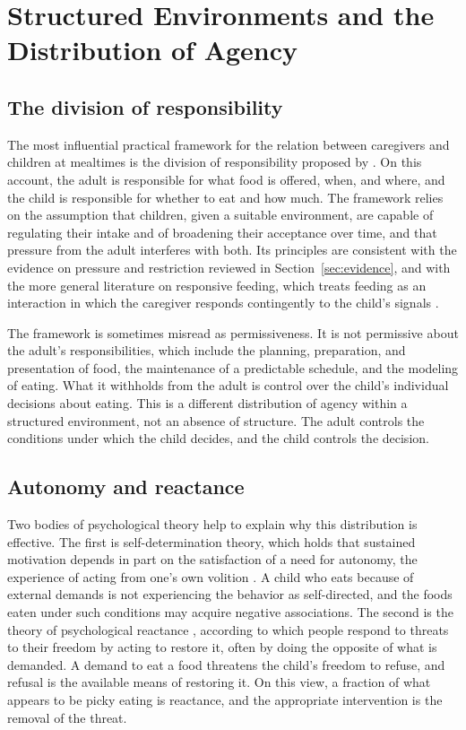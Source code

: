 \documentclass[11pt]{article}
\theoremstyle{remark}
\begin{document}
\section{Structured Environments and the Distribution of Agency}\label{sec:agency}

\subsection{The division of responsibility}

The most influential practical framework for the relation between caregivers and children at mealtimes is the division of responsibility proposed by \citet{satter1986feeding}. On this account, the adult is responsible for what food is offered, when, and where, and the child is responsible for whether to eat and how much. The framework relies on the assumption that children, given a suitable environment, are capable of regulating their intake and of broadening their acceptance over time, and that pressure from the adult interferes with both. Its principles are consistent with the evidence on pressure and restriction reviewed in Section~\ref{sec:evidence}, and with the more general literature on responsive feeding, which treats feeding as an interaction in which the caregiver responds contingently to the child's signals \citep{black2011responsive}.

The framework is sometimes misread as permissiveness. It is not permissive about the adult's responsibilities, which include the planning, preparation, and presentation of food, the maintenance of a predictable schedule, and the modeling of eating. What it withholds from the adult is control over the child's individual decisions about eating. This is a different distribution of agency within a structured environment, not an absence of structure. The adult controls the conditions under which the child decides, and the child controls the decision.

\subsection{Autonomy and reactance}

Two bodies of psychological theory help to explain why this distribution is effective. The first is self-determination theory, which holds that sustained motivation depends in part on the satisfaction of a need for autonomy, the experience of acting from one's own volition \citep{deci2000what}. A child who eats because of external demands is not experiencing the behavior as self-directed, and the foods eaten under such conditions may acquire negative associations. The second is the theory of psychological reactance \citep{brehm1966theory}, according to which people respond to threats to their freedom by acting to restore it, often by doing the opposite of what is demanded. A demand to eat a food threatens the child's freedom to refuse, and refusal is the available means of restoring it. On this view, a fraction of what appears to be picky eating is reactance, and the appropriate intervention is the removal of the threat.
\end{document}
